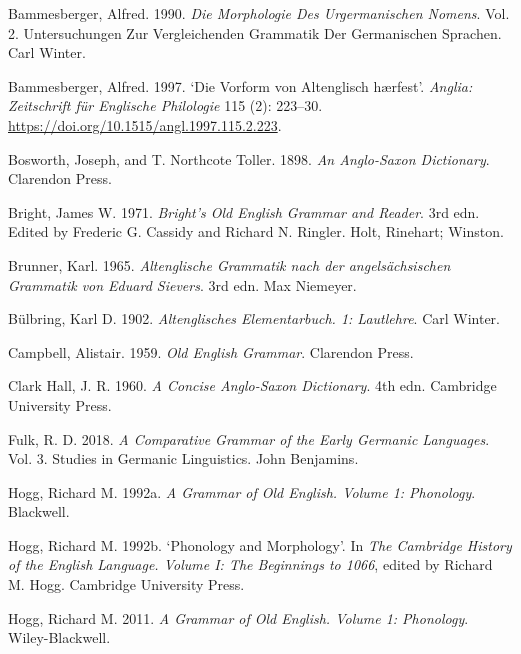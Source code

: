\documentclass[
  british,
  a4paper,
]{article}
\newlength{\cslhangindent}
\newenvironment{CSLReferences}[2] %
 {\begin{list}{}{%
  \setlength{\itemindent}{0pt}
  \setlength{\leftmargin}{0pt}
  \setlength{\parsep}{0pt}
  \ifodd #1
   \setlength{\leftmargin}{\cslhangindent}
   \setlength{\itemindent}{-1\cslhangindent}
  \fi
  \setlength{\itemsep}{#2\baselineskip}}}
 {\end{list}}
\begin{document}
\protect{}\label{refs}
\begin{CSLReferences}{1}{1}
Bammesberger, Alfred. 1990. \emph{Die Morphologie Des Urgermanischen
Nomens}. Vol. 2. Untersuchungen Zur Vergleichenden Grammatik Der
Germanischen Sprachen. Carl Winter.

Bammesberger, Alfred. 1997. {`Die Vorform von Altenglisch {h{æ}rfest}'}.
\emph{Anglia: Zeitschrift f{ü}r Englische Philologie} 115 (2): 223--30.
\url{https://doi.org/10.1515/angl.1997.115.2.223}.

Bosworth, Joseph, and T. Northcote Toller. 1898. \emph{An {Anglo-Saxon}
Dictionary}. Clarendon Press.

Bright, James W. 1971. \emph{Bright's {Old English} Grammar and Reader}.
3rd edn. Edited by Frederic G. Cassidy and Richard N. Ringler. Holt,
Rinehart; Winston.

Brunner, Karl. 1965. \emph{{Altenglische Grammatik nach der
angels{ä}chsischen Grammatik von Eduard Sievers}}. 3rd edn. Max
Niemeyer.

Bülbring, Karl D. 1902. \emph{Altenglisches Elementarbuch. 1:
Lautlehre}. Carl Winter.

Campbell, Alistair. 1959. \emph{Old {English} Grammar}. Clarendon Press.

Clark Hall, J. R. 1960. \emph{A Concise {Anglo-Saxon} Dictionary}. 4th
edn. Cambridge University Press.

Fulk, R. D. 2018. \emph{A Comparative Grammar of the Early {Germanic}
Languages}. Vol. 3. Studies in Germanic Linguistics. John Benjamins.

Hogg, Richard M. 1992a. \emph{A Grammar of Old {English}. Volume 1:
Phonology}. Blackwell.

Hogg, Richard M. 1992b. {`Phonology and Morphology'}. In \emph{The
{Cambridge} History of the {English} Language. Volume {I}: The
Beginnings to 1066}, edited by Richard M. Hogg. Cambridge University
Press.

Hogg, Richard M. 2011. \emph{A Grammar of Old {English}. Volume 1:
Phonology}. Wiley-Blackwell.


\end{CSLReferences}
\end{document}
